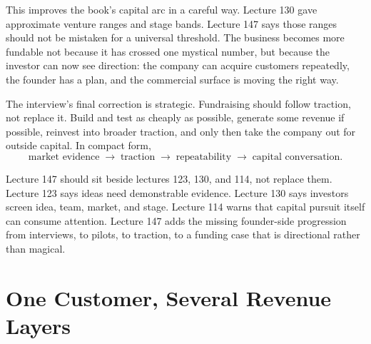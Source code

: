 \documentclass[11pt,oneside]{book}
\begin{document}
This improves the book's capital arc in a careful way. Lecture 130 gave approximate venture ranges and stage bands. Lecture 147 says those ranges should not be mistaken for a universal threshold. The business becomes more fundable not because it has crossed one mystical number, but because the investor can now see direction: the company can acquire customers repeatedly, the founder has a plan, and the commercial surface is moving the right way.

The interview's final correction is strategic. Fundraising should follow traction, not replace it. Build and test as cheaply as possible, generate some revenue if possible, reinvest into broader traction, and only then take the company out for outside capital. In compact form,
\[
\text{market evidence}
\;\longrightarrow\;
\text{traction}
\;\longrightarrow\;
\text{repeatability}
\;\longrightarrow\;
\text{capital conversation}.
\]

\begin{remark}
Lecture 147 should sit beside lectures 123, 130, and 114, not replace them. Lecture 123 says ideas need demonstrable evidence. Lecture 130 says investors screen idea, team, market, and stage. Lecture 114 warns that capital pursuit itself can consume attention. Lecture 147 adds the missing founder-side progression from interviews, to pilots, to traction, to a funding case that is directional rather than magical.
\end{remark}


\chapter{One Customer, Several Revenue Layers}
\end{document}
